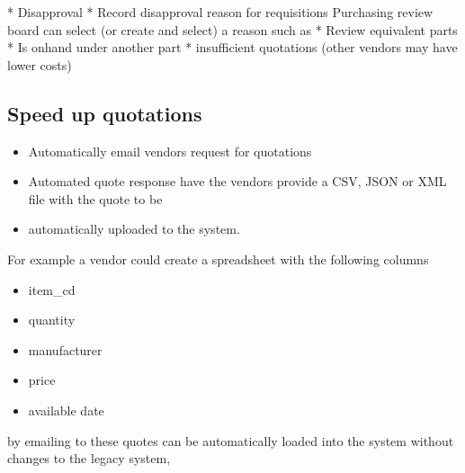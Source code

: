 \documentclass[letterpaper,10pt,english]{sphinxmanual}
\begin{document}
* Disapproval
\textbar{}  * Record disapproval reason for requisitions Purchasing review board
can select (or create and select) a reason such as
\textbar{}  * Review equivalent parts * Is onhand under another part *
insufficient quotations (other vendors may have lower costs)


\subsection{Speed up quotations}
\label{\detokenize{BusinessProcessReengineering:id9}}\begin{itemize}
\item {} 
Automatically email vendors request for quotations

\item {} 
Automated quote response have the vendors provide a CSV, JSON or XML
file with the quote to be

\item {} 
automatically uploaded to the system.

\end{itemize}

For example a vendor could create a spreadsheet with the following
columns
\begin{itemize}
\item {} 
item\_cd

\item {} 
quantity

\item {} 
manufacturer

\item {} 
price

\item {} 
available date

\end{itemize}

by emailing to  these quotes can be automatically
loaded into the system without changes to the legacy system,
\end{document}
